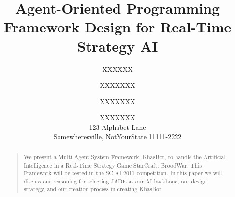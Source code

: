 \documentclass[letterpaper]{article}
\begin{document}
%
\title{Agent-Oriented Programming Framework Design for Real-Time Strategy AI}


\author{XXXXXX \and XXXXXXX \and XXXXXXX \and XXXXXXX \\
123 Alphabet Lane \\  Somewheresville, NotYourState 11111-2222
}

\maketitle
\begin{abstract}
\begin{quote}
We present a Multi-Agent System Framework, KhasBot, to handle the Artificial Intelligence in a Real-Time Strategy Game StarCraft: BroodWar.  This Framework will be tested in the SC AI 2011 competition.  In this paper we will discuss our reasoning for selecting JADE as our AI backbone, our design strategy, and our creation process in creating KhasBot.
\end{quote}
\end{abstract}
\end{document}
